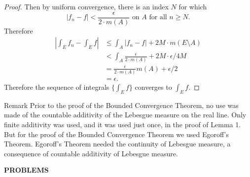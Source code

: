 \begin{flushleft}
\begin{proof}
        Then by uniform convergence, there is an index $N$ for which 
        \[
            |f_n-f|<\frac{\epsilon}{2\cdot m(A)}\text{ on }A\text{ for all }n\ge N.
        \]
        Therefore
        \begin{align*}
            |\int_Ef_n-\int_Ef|&\le\int_A|f_n-f|+2M\cdot m(E\setminus A)\\
            &<\int_A\frac{\epsilon}{2\cdot m(A)}+2M\cdot\epsilon/4M\\
            &=\frac{\epsilon}{2\cdot m(A)}m(A)+\epsilon/2\\
            &=\epsilon.
        \end{align*}
        Therefore the sequence of integrals $\{\int_Ef\}$ converges to $\int_Ef$.
    \end{proof}
\begin{namedthm*}{Remark}
    Prior to the proof of the Bounded Convergence Theorem, no use was made of the countable additivity of the Lebesgue measure on the real line.
    Only finite additivity was used, and it was used just once, in the proof of Lemma 1. But for the proof of the Bounded Convergence Theorem we used Egoroff's Theorem.
    Egoroff's Theorem needed the continuity of Lebesgue measure, a consequence of countable additivity of Lebesgue measure.    
\end{namedthm*}

\end{flushleft}
\begin{center}
	\textbf{PROBLEMS}
\end{center}
